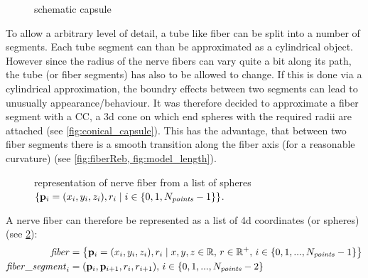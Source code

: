 % 
\begin{figure}[!t]
    \centering
    \setlength{\tikzwidth}{0.5\textwidth}
	\caption{schematic capsule}
	\label{fig:conical}
\end{figure}
% 
To allow a arbitrary level of detail, a tube like fiber can be split into a number of segments.
Each tube segment can than be approximated as a cylindrical object.
However since the radius of the nerve fibers can vary quite a bit along its path, the tube (or fiber segments) has also to be allowed to change.
If this is done via a cylindrical approximation, the boundry effects between two segments can lead to unusually appearance/behaviour.
It was therefore decided to approximate a fiber segment with a \ac{CC}, a 3d cone on which end spheres with the required radii are attached (see \cref{fig:conical_capsule}).
This has the advantage, that between two fiber segments there is a smooth transition along the fiber axis (for a reasonable curvature) (see \cref{fig:fiberReb, fig:model_length}).
% 
\begin{figure}[!t]
    \setlength{\tikzwidth}{0.85\textwidth}
    \centering
	\caption[]{representation of nerve fiber from a list of spheres $\left\{ \mathbf{p}_i=(x_i,y_i,z_i), r_i \mid i \in \{0,1,N_{\mathit{points}}-1\}\right\}$.}
	\label{fig:fiberReb}
\end{figure}
% 
A nerve fiber can therefore be represented as a list of 4d coordinates (or spheres) (see \cref{fig:fiberReb}):
% 
\begin{align}
\begin{split}
\mathit{fiber} &= \left\{ \mathbf{p}_i=(x_i,y_i,z_i), r_i \mid x,y,z \in \mathbb{R}, \, r \in \mathbb{R^+}, \, i \in \{0,1,...,N_{\mathit{points}}-1\}\right\} \\
\mathit{fiber\_segment}_i &= (\mathbf{p}_i, \mathbf{p}_{i+1}, r_i, r_{i+1}), \, i \in \{0,1,...,N_{\mathit{points}}-2\}
\end{split}
\end{align}
% 
